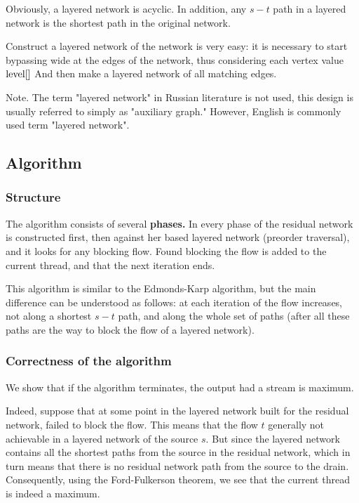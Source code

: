 Obviously, a layered network is acyclic. In addition, any $s-t$ path in a layered network is the shortest path in the original network.

Construct a layered network of the network is very easy: it is necessary to start bypassing wide at the edges of the network, thus considering each vertex value ${\rm level} []$ And then make a layered network of all matching edges.

Note. The term "layered network" in Russian literature is not used, this design is usually referred to simply as "auxiliary graph." However, English is commonly used term "layered network".

\subsection{ Algorithm }

\subsubsection{ Structure }

The algorithm consists of several \textbf{phases.} In every phase of the residual network is constructed first, then against her based layered network (preorder traversal), and it looks for any blocking flow. Found blocking the flow is added to the current thread, and that the next iteration ends.

This algorithm is similar to the Edmonds-Karp algorithm, but the main difference can be understood as follows: at each iteration of the flow increases, not along a shortest $s-t$ path, and along the whole set of paths (after all these paths are the way to block the flow of a layered network).

\subsubsection{ Correctness of the algorithm }

We show that if the algorithm terminates, the output had a stream is maximum.

Indeed, suppose that at some point in the layered network built for the residual network, failed to block the flow. This means that the flow $t$ generally not achievable in a layered network of the source $s$. But since the layered network contains all the shortest paths from the source in the residual network, which in turn means that there is no residual network path from the source to the drain. Consequently, using the Ford-Fulkerson theorem, we see that the current thread is indeed a maximum.

